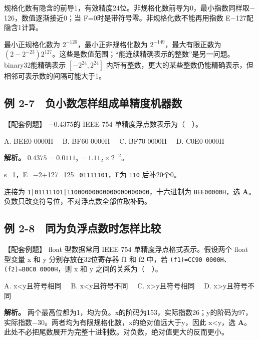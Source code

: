 规格化数有隐含的前导1，有效精度24位。非规格化数前导为0，最小指数同样取\ensuremath{-}126，数值逐渐接近0；当 F=0时是带符号零。非规格化数不能再用指数 E\ensuremath{-}127配隐含1计算。

最小正规格化数为 \(2^{-126}\)，最小正非规格化数为 \(2^{-149}\)，最大有限正数为 \((2-2^{-23})2^{127}\)。这些是数值范围；``能连续精确表示的整数''是另一问题。binary32能精确表示 \([-2^{24},2^{24}]\) 内所有整数，更大的某些整数仍能精确表示，但相邻可表示数的间隔可能大于1。

\subsection{例 2-7　负小数怎样组成单精度机器数}\label{CO02-19}

\begin{example}[配套例题]

【配套例题】 \ensuremath{-}0.4375的 IEEE 754 单精度浮点数表示为（　）。

A. BEE0 0000H　 B. BF60 0000H　 C. BF70 0000H　 D. C0E0 0000H

\end{example}

\textbf{解析。} \(0.4375=0.0111_2=1.11_2\times2^{-2}\)。

s=1，E=\ensuremath{-}2+127=125=\texttt{01111101}，F为 \texttt{110} 后补20个0。

连接为 \texttt{1|01111101|11000000000000000000000}，十六进制为 \texttt{BEE00000H}，选 \textbf{A}。负数只改变符号位，不对浮点数全部位取补码。

\subsection{例 2-8　同为负浮点数时怎样比较}\label{CO02-20}

\begin{example}[配套例题]

【配套例题】 float 型数据常用 IEEE 754 单精度浮点格式表示。假设两个 float 型变量 x 和 y 分别存放在32位寄存器 f1 和 f2 中，若 \texttt{(\allowbreak{}f1)\allowbreak{}=\allowbreak{}CC90 0000H}、\texttt{(\allowbreak{}f2)\allowbreak{}=\allowbreak{}B0C0 0000H}，则 x 和 y 之间的关系为（　）。

A. x\textless y且符号相同　 B. x\textless y且符号不同　 C. x\textgreater y且符号相同　 D. x\textgreater y且符号不同

\end{example}

\textbf{解析。} 两个最高位都为1，均为负。x的阶码为153，实际指数26；y的阶码为97，实际指数\ensuremath{-}30。两者均为有限规格化数，x的绝对值远大于y，因此 x\textless y，选 \textbf{A}。此处不必把尾数展开为完整十进制数。对负数，绝对值更大的反而更小。

